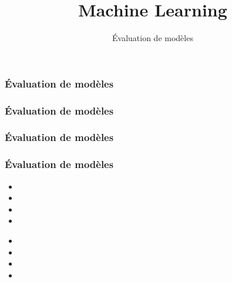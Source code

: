 \documentclass{formation}
\title{Machine Learning}
\subtitle{Évaluation de modèles}
\begin{document}
\maketitle

\begin{frame}
  \frametitle{Évaluation de modèles}
\end{frame}

\begin{frame}
  \frametitle{Évaluation de modèles}
  
\end{frame}

\begin{frame}
  \frametitle{Évaluation de modèles}
\end{frame}

\begin{frame}
  \frametitle{Évaluation de modèles}

  
  \begin{itemize}
  \item 
  \item 
  \item 
  \item 
  \end{itemize}

  \begin{minipage}[l]{0.49\linewidth}
  \end{minipage}\hfill
  \begin{minipage}[l]{0.49\linewidth}
  \end{minipage}\hfill

  \begin{minipage}[l]{0.49\linewidth}
      \begin{itemize}
      \item 
      \item 
      \item 
      \item 
      \end{itemize}
  \end{minipage}\hfill
  \begin{minipage}[l]{0.49\linewidth}
  \end{minipage}\hfill

\end{frame}
\end{document}
